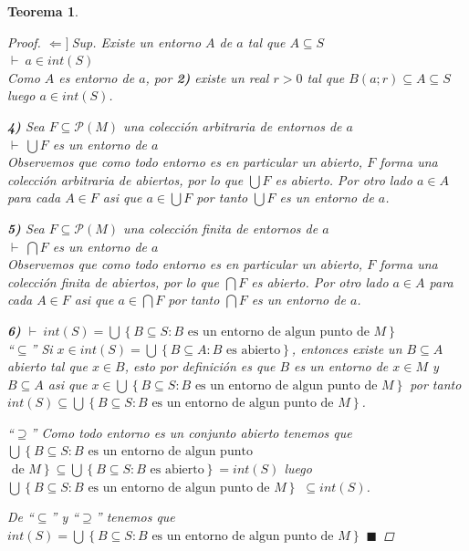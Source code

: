 \documentclass[oneside]{book} %
\theoremstyle{Teorema}
\newtheorem{Teorema}[Definicion]{Teorema}
\theoremstyle{Ejemplos}
\theoremstyle{[Obs]}
\renewcommand{\{}{\left\lbrace} %
\renewcommand{\}}{\right\rbrace} %
\newcommand{\U}{\bigcup} %
\newcommand{\N}{\bigcap} %
\renewcommand{\sc}{\subseteq} %
\renewcommand{\P}{\mathcal{P}} %
\renewcommand{\qed}{$\blacksquare$} %
\newcommand{\pd}{$\vdash\ $} %
\newcommand{\suficiencia}{$\Leftarrow]\ $} %
\begin{document}
\begin{Teorema}
\begin{proof}
					\suficiencia Sup. Existe un entorno $A$ de $a$ tal que $A \sc S$ \\ 
					\pd $a \in int(S)$ \\ 
					Como $A$ es entorno de $a$, por \textbf{2)} existe un real $r > 0$ tal que $B(a;r) \sc A \sc S$ luego $a \in int(S)$. 

					\textbf{4)} Sea $F \sc \P(M)$ una colección arbitraria de entornos de $a$ \\ 
					\pd $\U F$ es un entorno de $a$ \\ 
					Observemos que como todo entorno es en particular un abierto, $F$ forma una colección arbitraria de abiertos, por lo que $\U F$ es abierto. Por otro lado $a \in A$ para cada $A \in F$ asi que $a \in \U F$ por tanto $\U F$ es un entorno de $a$. 

					\textbf{5)} Sea $F \sc \P(M)$ una colección finita de entornos de $a$ \\ 
					\pd $\N F$ es un entorno de $a$ \\ 
					Observemos que como todo entorno es en particular un abierto, $F$ forma una colección finita de abiertos, por lo que $\N F$ es abierto. Por otro lado $a \in A$ para cada $A \in F$ asi que $a \in \N F$ por tanto $\N F$ es un entorno de $a$. 

					\textbf{6)} \pd $int(S) = \U\{ B \sc S : B \text{ es un entorno de algun punto de } M \}$ \\ 
					``$\sc$'' Si $x \in int(S) = \U\{ B \sc A : B \text{ es abierto} \}$, entonces existe un $B \sc A$ abierto tal que $x \in B$, esto por definición es que $B$ es un entorno de $x \in M$ y $B \sc A$ asi que $x \in \U\{ B \sc S : B \text{ es un entorno de algun} \right.$ $\left. \text{punto de } M \}$ por tanto $int(S) \sc \U\{ B \sc S : B \text{ es un entorno de algun punto de } M \}$.

					``$\supseteq$'' Como todo entorno es un conjunto abierto tenemos que $\U\{ B \sc S : B \text{ es un entorno de algun punto} \right.$ $\left. \text{ de } M \} \sc \U\{ B \sc S : B \text{ es abierto} \} = int(S)$ luego $\U\{ B \sc S : B \text{ es un entorno de algun punto de } M \}$ $\sc int(S)$.

					De ``$\sc$'' y ``$\supseteq$'' tenemos que $int(S) = \U\{ B \sc S : B \text{ es un entorno de algun punto de } M \}$ \qed

				\end{proof}

			\end{Teorema}
\end{document}

